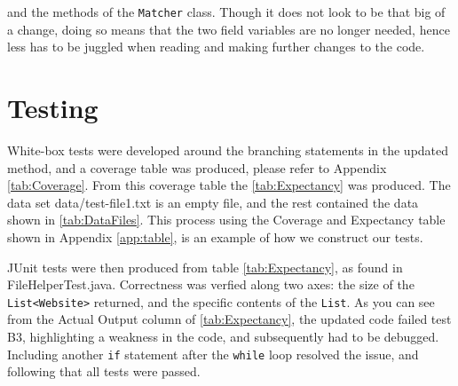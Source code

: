 and the methods of the {\tt Matcher} class. Though it does not look to be that big of a change, doing so means that the two field variables are no longer needed, hence less has to be juggled when reading and making further changes to the code.

\section{Testing}
White-box tests were developed around the branching statements in the updated method, and a coverage table was produced, please refer to Appendix \ref{tab:Coverage}. From this coverage table the \ref{tab:Expectancy} was produced. The data set data/test-file1.txt is an empty file, and the rest contained the data shown in \ref{tab:DataFiles}. This process using the Coverage and Expectancy table shown in Appendix \ref{app:table}, is an example of how we construct our tests.

JUnit tests were then produced from table \ref{tab:Expectancy}, as found in FileHelperTest.java. Correctness was verfied along two axes: the size of the {\tt List<Website>} returned, and the specific contents of the {\tt List}. As you can see from the Actual Output column of \ref{tab:Expectancy}, the updated code failed test B3, highlighting a weakness in the code, and subsequently had to be debugged. Including another {\tt if} statement after the {\tt while} loop resolved the issue, and following that all tests were passed.